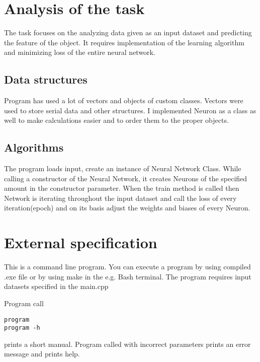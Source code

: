 \documentclass[12pt,a4paper,twoside]{article}
\let\oldmarginpar\marginpar
\renewcommand\marginpar[1]{%
  {\linespread{0.85}\normalfont\scriptsize%
\oldmarginpar[\hspace{1cm}\begin{minipage}{3cm}\raggedleft\scriptsize\color{black}\textsf{#1}\end{minipage}]%
{\hspace{0cm}\begin{minipage}{3cm}\raggedright\scriptsize\color{black}\textsf{#1}\end{minipage}}%
}%
}
\begin{document}
\section{Analysis of the task}

The task focuses on the analyzing data given as an input dataset and predicting the feature of the object. It requires implementation of the learning algorithm and minimizing loss of the entire neural network.

\subsection{Data structures}
Program has used a lot of vectors and objects of custom classes. Vectors were used to store serial data and other structures. I implemented Neuron as a class as well to make calculations easier and to order them to the proper objects.

\subsection{Algorithms}
The program loads input, create an instance of Neural Network Class. While calling a constructor of the Neural Network, it creates Neurons of the specified amount in the constructor parameter. When the train method is called then Network is iterating throughout the input dataset and call the loss of every iteration(epoch) and on its basis adjust the weights and biases of every Neuron.

\section{External specification}
\label{sec:external}
This is a command line program.%
You can execute a program by using compiled .exe file or by using make in the e.g. Bash terminal.
The program requires input datasets specified in the main.cpp

Program call
\begin{verbatim}
program 
program -h
\end{verbatim}
prints a short manual. Program called with incorrect parameters prints an error message and prints help.
\end{document}
